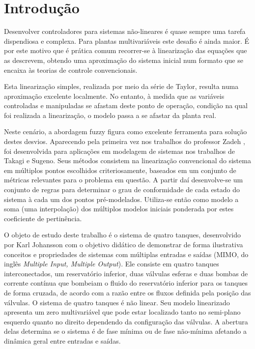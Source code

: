 %

\chapter{Introdução} \label{capIntrod}
Desenvolver controladores para sistemas não-lineares é quase sempre uma tarefa dispendiosa e complexa. Para plantas multivariáveis este desafio é ainda maior. É por este motivo que é prática comum recorrer-se à linearização das equações que as descrevem, obtendo uma aproximação do sistema inicial num formato que se encaixa às teorias de controle convencionais.

Esta linearização simples, realizada por meio da série de Taylor, resulta numa aproximação excelente localmente. No entanto, à medida que as variáveis controladas e manipuladas se afastam deste ponto de operação, condição na qual foi realizada a linearização, o modelo passa a se afastar da planta real.

Neste cenário, a abordagem fuzzy figura como excelente ferramenta para solução destes desvios. Aparecendo pela primeira vez nos trabalhos do professor Zadeh \cite{zadeh}, foi desenvolvida para aplicações em modelagem de sistemas nos trabalhos de Takagi e Sugeno\cite{takagiSugeno}. Seus métodos consistem na linearização convencional do sistema em múltiplos pontos escolhidos criteriosamente, baseados em um conjunto de métricas relevantes para o problema em questão. A partir daí desenvolve-se um conjunto de regras para determinar o grau de conformidade de cada estado do sistema à cada um dos pontos pré-modelados. Utiliza-se então como modelo a soma (uma interpolação) dos múltiplos modelos iniciais ponderada por estes coeficiente de pertinência. 

O objeto de estudo deste trabalho é o sistema de quatro tanques, desenvolvido por Karl Johansson \cite{johansson2} com o objetivo didático de demonstrar de forma ilustrativa conceitos e propriedades de sistemas com múltiplas entradas e saídas (MIMO, do inglês \textit{Multiple Input, Multiple Output}). Ele consiste em quatro tanques interconectados, um reservatório inferior, duas válvulas esferas e duas bombas de corrente contínua que bombeiam o fluido do reservatório inferior para os tanques de forma cruzada, de acordo com a razão entre os fluxos definida pela posição das válvulas. O sistema de quatro tanques é não linear. Seu modelo linearizado apresenta um zero multivariável que pode estar localizado tanto no semi-plano esquerdo quanto no  direito dependendo da configuração das válvulas. A abertura delas determina se o sistema é de fase mínima ou de fase não-mínima afetando a dinâmica geral entre entradas e saídas.

